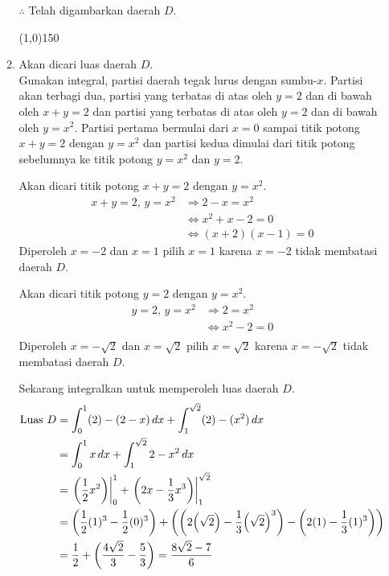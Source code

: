 \begin{enumerate}[leftmargin=*, label={\arabic*}.]
\begin{enumerate}[label={\alph*}.]
\begin{center}
\end{center}
$\therefore$ Telah digambarkan daerah $D$.
\begin{center}
    \line(1,0){150}
\end{center}
    \item Akan dicari luas daerah $D$.\\
    Gunakan integral, partisi daerah tegak lurus dengan sumbu-$x$. Partisi akan terbagi dua, partisi 
    yang terbatas di atas oleh $y=2$ dan di bawah oleh $x+y=2$ dan partisi yang terbatas di atas oleh 
    $y=2$ dan di bawah oleh $y=x^2$. Partisi pertama bermulai dari $x=0$ sampai titik potong $x+y=2$ 
    dengan $y=x^{2}$ dan partisi kedua dimulai dari titik potong sebelumnya ke titik potong $y=x^{2}$ 
    dan $y=2$.

    Akan dicari titik potong $x+y=2$ dengan $y=x^{2}$.
    \begin{align*}
        x+y=2,\,y=x^{2} &\Longrightarrow 2-x = x^{2}\\
        &\iff x^{2}+x-2=0\\
        &\iff (x+2)(x-1)=0
    \end{align*}
    Diperoleh $x=-2$ dan $x=1$ pilih $x=1$ karena $x=-2$ tidak membatasi daerah $D$.

    Akan dicari titik potong $y=2$ dengan $y=x^{2}$.
    \begin{align*}
        y=2,\,y=x^{2} &\Longrightarrow 2 = x^{2}\\
        &\iff x^2-2=0\\
    \end{align*}
    Diperoleh $x=-\sqrt{2}$ dan $x=\sqrt{2}$ pilih $x=\sqrt{2}$ karena $x=-\sqrt{2}$ 
    tidak membatasi daerah $D$.

    Sekarang integralkan untuk memperoleh luas daerah $D$.
    \begin{align*}
        \text{Luas $D$} &= \int_{0}^{1} (2)-(2-x)\,dx + \int_{1}^{\sqrt{2}} (2)-(x^{2})\,dx\\
        &= \int_{0}^{1} x\,dx + \int_{1}^{\sqrt{2}} 2-x^{2}\,dx\\
        &= \eval{\frac{1}{2}x^{2}}{0}{1}+\eval{2x-\frac{1}{3}x^{3}}{1}{\sqrt{2}}\\
        &= \brk*{\frac{1}{2}(1)^{3}-\frac{1}{2}(0)^{3}}
        +\brk*{\brk*{2\brk*{\sqrt{2}}-\frac{1}{3}\brk*{\sqrt{2}}^{3}}
        -\brk*{2(1)-\frac{1}{3}(1)^{3}}}\\
        &=\frac{1}{2}+\brk*{\frac{4\sqrt{2}}{3}-\frac{5}{3}}=\frac{8\sqrt{2}-7}{6}
    \end{align*}


\end{enumerate}
\end{enumerate}
